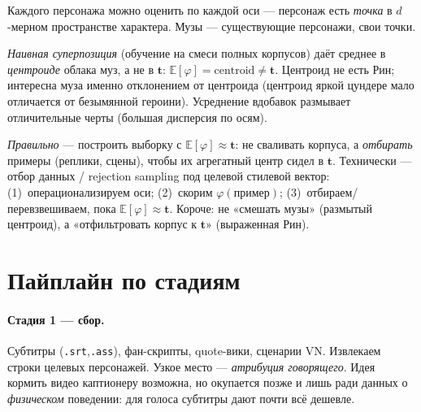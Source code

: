 Каждого персонажа можно оценить по каждой оси — персонаж есть \emph{точка} в
$d$-мерном пространстве характера. Музы — существующие персонажи, свои точки.

\emph{Наивная суперпозиция} (обучение на смеси полных корпусов) даёт среднее в
\emph{центроиде} облака муз, а не в $\mathbf{t}$: $\mathbb{E}[\varphi]=\text{centroid}\ne\mathbf{t}$.
Центроид не есть Рин; интересна муза именно отклонением от центроида (центроид яркой
цундере мало отличается от безымянной героини). Усреднение вдобавок размывает
отличительные черты (большая дисперсия по осям).

\emph{Правильно} — построить выборку с $\mathbb{E}[\varphi]\approx\mathbf{t}$: не
сваливать корпуса, а \emph{отбирать} примеры (реплики, сцены), чтобы их агрегатный
центр сидел в $\mathbf{t}$. Технически — отбор данных / rejection sampling под целевой
стилевой вектор: (1)~операционализируем оси; (2)~скорим $\varphi(\text{пример})$;
(3)~отбираем/перевзвешиваем, пока $\mathbb{E}[\varphi]\approx\mathbf{t}$. Короче: не
«смешать музы» (размытый центроид), а «отфильтровать корпус к $\mathbf{t}$»
(выраженная Рин).

\section{Пайплайн по стадиям}

\begin{center}
\end{center}

\paragraph{Стадия 1 — сбор.} Субтитры (\texttt{.srt},\texttt{.ass}), фан-скрипты,
quote-вики, сценарии VN. Извлекаем строки целевых персонажей. Узкое место —
\emph{атрибуция говорящего}. Идея кормить видео каптионеру возможна, но окупается
позже и лишь ради данных о \emph{физическом} поведении: для голоса субтитры дают
почти всё дешевле.

